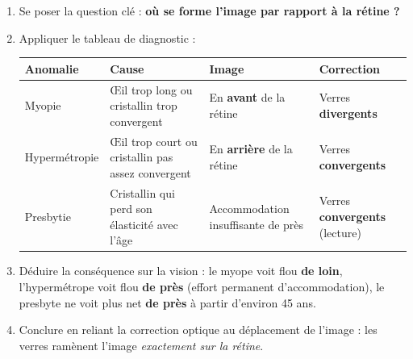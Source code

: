 \documentclass[11pt]{article}
\begin{document}
\begin{methode}
\begin{enumerate}
\item Se poser la question clé : \textbf{où se forme l'image par rapport à la rétine ?}
\item Appliquer le tableau de diagnostic :
\begin{center}
\begin{tabularx}{\linewidth}{|l|X|X|X|}
\hline
\rowcolor{popblueL} \textbf{Anomalie} & \textbf{Cause} & \textbf{Image} & \textbf{Correction} \\
\hline
Myopie & Œil trop long ou cristallin trop convergent & En \textbf{avant} de la rétine & Verres \textbf{divergents} \\
\hline
Hypermétropie & Œil trop court ou cristallin pas assez convergent & En \textbf{arrière} de la rétine & Verres \textbf{convergents} \\
\hline
Presbytie & Cristallin qui perd son élasticité avec l'âge & Accommodation insuffisante de près & Verres \textbf{convergents} (lecture) \\
\hline
\end{tabularx}
\end{center}
\item Déduire la conséquence sur la vision : le myope voit flou \textbf{de loin}, l'hypermétrope voit flou \textbf{de près} (effort permanent d'accommodation), le presbyte ne voit plus net \textbf{de près} à partir d'environ 45 ans.
\item Conclure en reliant la correction optique au déplacement de l'image : les verres ramènent l'image \emph{exactement sur la rétine}.
\end{enumerate}
\end{methode}
\end{document}
